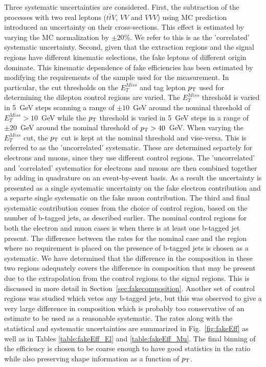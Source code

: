Three systematic uncertainties are considered. First, the subtraction of the processes with 
two real leptons ($t\bar{t}V$, $VV$ and $VVV$) using MC prediction introduced an uncertainty on 
their cross-sections. This effect is estimated by varying the MC normalization by $\pm 20$\%.  %
We refer to this is as the 'correlated' systematic uncertainty.
Second, given that the extraction regions and the signal regions have different kinematic selections, 
the fake leptons of different origin dominate. This kinematic dependence of fake efficiencies has been estimated 
by modifying the requirements of the sample used for the measurement. In particular, the cut thresholds 
on the $E_{T}^{Miss}$ and tag lepton $p_{\mathrm{T}}$ used
for determining the dilepton control regions are varied. The $E_{T}^{Miss}$ threshold is 
varied in 5~GeV steps scanning a range of $\pm 10$~GeV around the nominal
threshold of $E_{T}^{Miss} > 10$~GeV while the $p_{\mathrm{T}}$ threshold is varied in 5~GeV steps in a range of $\pm 20$~GeV 
around the nominal threshold of $p_{\mathrm{T}} > 40$~GeV.  When varying the $E_{T}^{Miss}$ cut, the $p_{\mathrm{T}}$ cut
is kept at the nominal threshold and vise-versa. This is referred to as the 'uncorrelated' systematic.
These are determined separtely for electrons and muons, since they use different control regions. The 'uncorrelated' and
'correlated' systematics for electrons and muons are then combined together by adding in quadrature on an event-by-event basis.
As a result the uncertainty is presented as a single systematic uncertainty on the fake electron
contribution and a separte single systematic on the fake muon contribution.
The third and final systematic contribution comes from the choice of control region, based on the number of b-tagged
jets, as described earlier.  The nominal control regions for both the electron and muon cases is when 
there is at least one b-tagged jet present.  The difference between the rates for the nominal case
and the region where no requirement is placed on the presence of b-tagged jets is chosen as a systematic.
We have determined that the difference in the composition in these two regions adequately covers the difference
in composition that may be present due to the extrapolation from the control regions to the signal regions. This is 
discussed in more detail in Section~\ref{sec:fakecomposition}.  Another set of control regions was studied
which vetos any b-tagged jets, but this was observed to give a very large difference in composition which is 
probably too conservative of an estimate to be used as a reasonable systematic.
The rates along with the statistical and systematic uncertainties are summarized in Fig.~\ref{fig:fakeEff} 
as well as in Tables \ref{table:fakeEff_El} and \ref{table:fakeEff_Mu}.
The final binning of the efficiency is chosen to be coarse enough
to have good statistics in the ratio while also preserving shape information as a function
of $p_{\mathrm{T}}$. 


